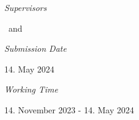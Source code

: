 \begin{titlepage}
	\vfill
	\begin{minipage}[t]{.27\textwidth}
		\raggedleft
		\textit{Supervisors}
	\end{minipage}
	\hspace*{15pt}
	\begin{minipage}[t]{.65\textwidth}
		\thesisFirstSupervisor\ and \thesisSecondSupervisor
	\end{minipage} 

	\begin{minipage}[t]{.27\textwidth}
		\raggedleft
		\textit{Submission Date}
	\end{minipage}
	\hspace*{15pt}
	\begin{minipage}[t]{.65\textwidth}
		14. May 2024
	\end{minipage} 

	\begin{minipage}[t]{.27\textwidth}
		\raggedleft
		\textit{Working Time}
	\end{minipage}
	\hspace*{15pt}
	\begin{minipage}[t]{.65\textwidth}
		14. November 2023 - 14. May 2024
	\end{minipage} 

	

\end{titlepage}







